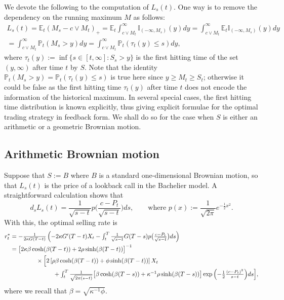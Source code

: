 \documentclass[openany,oneside]{article}
\theoremstyle{definition}
\theoremstyle{remark}
\newtheorem{rem}[thm]{Remark}
\newcommand{\E}{\mathbb{E}} %
\renewcommand{\P}{\mathbb{P}} %
\newcommand{\I}{\mathbb{I}} %
\newcommand{\ts}{\textstyle}
\begin{document}

We devote the following to the computation of $L_s(t)$. One way is to remove the dependency on the running maximum $M$ as follows:
\begin{multline*}
\ts L_s(t) = \E_t(M_s-c\vee M_t)_+ = \E_t \int_{c\vee M_t}^{\infty}\I_{(-\infty,M_s)}(y) dy = \int_{c\vee M_t}^\infty \E_t \I_{(-\infty,M_s)}(y)dy \\
 \ts = \int_{c\vee M_t}^\infty \P_t(M_s > y) dy= \int_{c\vee M_t}^\infty \P_t(\tau_t(y) \le s) dy,
\end{multline*}
where $\tau_t(y):=\inf\{s\in[t,\infty] : S_s> y\}$ is the first hitting time of the set $(y,\infty)$ after time $t$ by $S$. Note that the identity $\P_t(M_s > y) = \P_t(\tau_t(y)\le s)$ is true here since $y\ge M_t\ge S_t$; otherwise it could be false as the first hitting time $\tau_t(y)$ after time $t$ does not encode the information of the historical maximum. In several special cases, the first hitting time distribution is known explicitly, thus giving explicit formulae for the optimal trading strategy in feedback form. We shall do so for the case when $S$ is either an arithmetic or a geometric Brownian motion.

\subsection{Arithmetic Brownian motion}
Suppose that $S:=B$ where $B$ is a standard one-dimensional Brownian motion, so that $L_s(t)$ is the price of a lookback call in the Bachelier model. A straightforward calculation shows that
\[
 \ts d_s L_s(t) = \frac{1}{\sqrt{s-t}}p\bigl(\frac{c-P_t}{\sqrt{s-t}}\bigr)ds,\qquad\text{where } p(x):=\frac{1}{\sqrt{2\pi}}e^{-\frac{1}{2}x^2}.
\]
With this, the optimal selling rate is
\begin{align*}
r^\ast_t &\ts= -\frac{1}{2\kappa G(T-t)}\left(-2\kappa G'(T-t) X_t - \int_t^T \frac{1}{\sqrt{s-t}} G(T-s) p\bigl(\frac{c-P_t}{\sqrt{s-t}}\bigr) ds\right) \\
&= \bigl[2\kappa\beta\cosh(\beta (T-t))+2\rho\sinh(\beta (T-t))\bigr]^{-1} \\
&\hspace{1.5cm} \times \Bigl[2\left[\rho\beta\cosh(\beta (T-t))+\phi\sinh(\beta (T-t))\right] X_t\\
&\ts\hspace{2.5cm} + \int_t^T \frac{1}{\sqrt{2\pi(s-t)}}\bigl[\beta\cosh(\beta (T-s))+\kappa^{-1}\rho\sinh(\beta (T-s))\bigr] \exp{\left(-\frac{1}{2}\frac{(c-P_t)^2}{s-t}\right)} ds \Bigr],
\end{align*}
where we recall that $\beta=\sqrt{\kappa^{-1}\phi}$.
\end{document}
